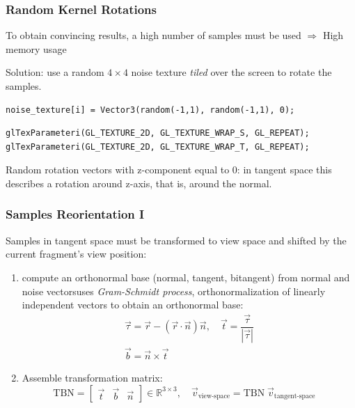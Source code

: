 \documentclass{beamer}
\begin{document}
\begin{frame}[fragile]
\frametitle{Random Kernel Rotations}
To obtain convincing results, a high number of samples must be used $ \Rightarrow $ High memory usage

Solution: use a random $ 4\times4 $ noise texture \emph{tiled} over the screen to rotate the samples.
\begin{verbatim}
noise_texture[i] = Vector3(random(-1,1), random(-1,1), 0);
\end{verbatim}
\vspace{-1cm}
\begin{verbatim}
glTexParameteri(GL_TEXTURE_2D, GL_TEXTURE_WRAP_S, GL_REPEAT);
glTexParameteri(GL_TEXTURE_2D, GL_TEXTURE_WRAP_T, GL_REPEAT);
\end{verbatim} 

Random rotation vectors with z-component equal to 0: in tangent space this describes a rotation around z-axis, that is, around the normal.

\end{frame}

\begin{frame}
\frametitle{Samples Reorientation I}
Samples in tangent space must be transformed to view space and shifted by the current fragment's view position:
\begin{enumerate}
    \item compute an orthonormal base (normal, tangent, bitangent) from normal and noise vectors\textemdash{}uses \emph{Gram-Schmidt process}, orthonormalization of linearly independent vectors to obtain an orthonormal base:
    \begin{gather*}
        \vec{\tau} = \vec{r} - (\vec{r} \cdot \vec{n}) \vec{n}, \quad \vec{t} = \dfrac{\vec{\tau}}{|\vec{\tau}|} \\
        \vec{b} = \vec{n} \times \vec{t}
    \end{gather*}
    \item Assemble transformation matrix:
    \[
    \text{TBN} =
    \begin{bmatrix}
    \vec{t} & \vec{b} & \vec{n}
    \end{bmatrix} \in \mathbb{R}^{3\times3},
    \quad \vec{v}_{\text{view-space}} = \text{TBN} \; \vec{v}_{\text{tangent-space}}\quad
    \]
\end{enumerate}

\end{frame}
\end{document}
